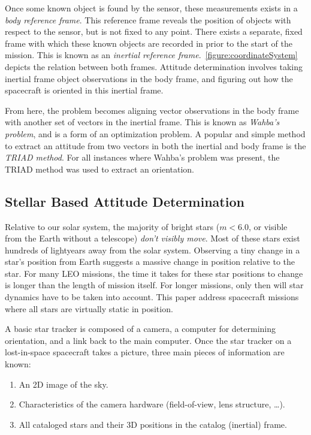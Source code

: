 Once some known object is found by the sensor, these measurements exists in a \textit{body reference frame}. This
reference frame reveals the position of objects with respect to the sensor, but is not fixed to any point. There exists
a separate, fixed frame with which these known objects are recorded in prior to the start of the mission. This is known
as an \textit{inertial reference frame}.~\autoref{figure:coordinateSystem} depicts the relation between both
frames. Attitude determination involves taking inertial frame object observations in the body frame, and figuring out
how the spacecraft is oriented in this inertial frame.

From here, the problem becomes aligning vector observations in the body frame with another set of vectors in the
inertial frame. This is known as \textit{Wahba's problem}, and is a form of an optimization problem. A popular and
simple method to extract an attitude from two vectors in both the inertial and body frame is the \textit{TRIAD method}.
For all instances where Wahba's problem was present, the TRIAD method was used to extract an orientation.

\subsection{Stellar Based Attitude Determination}\label{subsec:stellarBasedAttitudeDetermination}
Relative to our solar system, the majority of bright stars ($m < 6.0$, or visible from the Earth without a telescope)
\textit{don't visibly move}. Most of these stars exist hundreds of lightyears away from the solar system. Observing a
tiny change in a star's position from Earth suggests a massive change in position relative to the star. For many LEO
missions, the time it takes for these star positions to change is longer than the length of mission itself. For longer
missions, only then will star dynamics have to be taken into account. This paper address spacecraft missions where all
stars are virtually static in position.

A basic star tracker is composed of a camera, a computer for determining orientation, and a link back to the main
computer. Once the star tracker on a lost-in-space spacecraft takes a picture, three main pieces of information are
known:
\begin{enumerate}
    \item An 2D image of the sky.
    \item Characteristics of the camera hardware (field-of-view, lens structure, \ldots).
    \item All cataloged stars and their 3D positions in the catalog (inertial) frame.
\end{enumerate}

